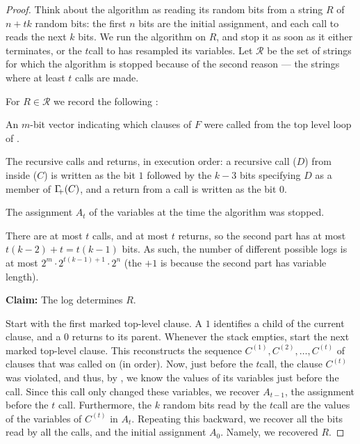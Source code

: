 \begin{proof}
    Think about the algorithm as reading its random bits from a string
    $R$ of $n + tk$ random bits: the first $n$ bits are the initial
    assignment, and each call to \FixAlg reads the next $k$ bits. We
    run the algorithm on $R$, and stop it as soon as it either
    terminates, or the $t$\th call to \FixAlg has resampled its
    variables. Let
    $\mathcal{R}$ be the set of strings for which the algorithm is
    stopped because of the second reason --- the strings where at least
    $t$ calls are made.

    For $R \in \mathcal{R}$ we record the following
    :
    \begin{compactenumi}
        \item An $m$-bit vector indicating which clauses of $F$ were
        called from the top level loop of \SolveAlg.

        \item The recursive calls and returns, in execution order:
        a recursive call \FixAlg{}($D$) from inside \FixAlg{}($C$) is
        written as the bit $1$ followed by the $k-3$ bits specifying
        $D$ as a member of $\NbrCX{C}$, and a return from a call is
        written as the bit $0$.

        \item The assignment $A_t$ of the variables at the time the
        algorithm was stopped.
    \end{compactenumi}
    There are at most $t$ calls, and at most $t$ returns, so the
    second part has at most $t(k-2) + t = t(k-1)$ bits. As such, the
    number of different possible logs is at most
    $2^m \cdot 2^{t(k-1)+1} \cdot 2^n$ (the $+1$ is because the second
    part has variable length).

    \smallskip

    \noindent\textbf{Claim:} The log determines $R$.

    Start with the first marked top-level clause. A $1$ identifies
    a child of the current clause, and a $0$ returns to its parent.
    Whenever the stack empties, start the next marked top-level clause.
    This reconstructs the sequence
    $C^{(1)}, C^{(2)}, \ldots, C^{(t)}$ of clauses that \FixAlg was
    called on (in order). Now, just before the $t$\th call, the clause
    $C^{(t)}$ was violated, and thus, by
    , we know the values of its variables
    just before the call. Since this call only changed these
    variables, we recover $A_{t-1}$, the assignment before the $t$\th
    call. Furthermore, the $k$ random bits read by the $t$\th call are
    the values of the variables of $C^{(t)}$ in $A_t$. Repeating this
    backward, we recover all the bits read by all the calls, and the
    initial assignment $A_0$. Namely, we recovered $R$.


\end{proof}
